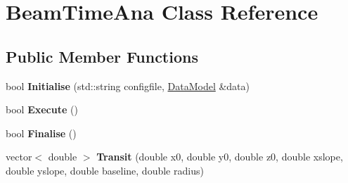 \hypertarget{classBeamTimeAna}{
\section{BeamTimeAna Class Reference}
\label{classBeamTimeAna}
}
\subsection*{Public Member Functions}
\begin{DoxyCompactItemize}
\item 
\hypertarget{classBeamTimeAna_ac5cfa1bfcae38f8b06e35165c34bc7a1}{
bool {\bfseries Initialise} (std::string configfile, \hyperlink{classDataModel}{DataModel} \&data)}
\label{classBeamTimeAna_ac5cfa1bfcae38f8b06e35165c34bc7a1}

\item 
\hypertarget{classBeamTimeAna_a7b308e1c38e71d712f86134f32d6f608}{
bool {\bfseries Execute} ()}
\label{classBeamTimeAna_a7b308e1c38e71d712f86134f32d6f608}

\item 
\hypertarget{classBeamTimeAna_a6327c7597f973dc8d379bab637d49158}{
bool {\bfseries Finalise} ()}
\label{classBeamTimeAna_a6327c7597f973dc8d379bab637d49158}

\item 
\hypertarget{classBeamTimeAna_a7371db48a169030dc1f3c4aef1d2118f}{
vector$<$ double $>$ {\bfseries Transit} (double x0, double y0, double z0, double xslope, double yslope, double baseline, double radius)}
\label{classBeamTimeAna_a7371db48a169030dc1f3c4aef1d2118f}

\end{DoxyCompactItemize}
